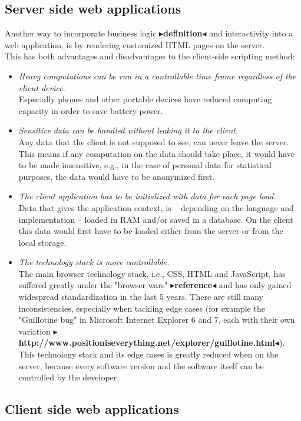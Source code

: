 \documentclass[twoside,11pt,openright]{report}
\newcommand{\todo}[1]{{\color[rgb]{.5,0,0}\textbf{$\blacktriangleright$#1$\blacktriangleleft$}}}
\begin{document}
\subsection{Server side web applications}
Another way to incorporate business logic \todo{definition} and
interactivity into a web application, is by rendering customized HTML pages
on the server.\\
This has both advantages and disadvantages to the client-side scripting method:
\begin{itemize}
	\item \emph{Heavy computations can be run in a controllable time frame
	regardless of the client device.}\\
		Especially phones and other portable devices have reduced computing
		capacity in order to save battery power.
	\item \emph{Sensitive data can be handled without leaking it to the
	client.}\\
		Any data that the client is not supposed to see, can never leave the
		server. This means if any computation on the data should take place,
		it would have to be made insensitive, e.g., in the case of personal data
		for statistical purposes, the data would have to be anonymized first.
	\item \emph{The client application has to be initialized with data for each
	page load.}\\
		Data that gives the application context, is -- depending on the language
		and implementation -- loaded in RAM and/or saved in a database. On the
		client this data would first have to be loaded either from the server or
		from the local storage.
	\item \emph{The technology stack is more controllable.}\\
		The main browser technology stack, i.e., CSS, HTML and JavaScript,
		has suffered greatly under the "browser wars" \todo{reference}
		and has only gained widespread standardization in the last 5 years.
		There are still many inconsistencies, especially when tackling edge cases
		(for example the "Guillotine bug" in Microsoft Internet Explorer 6 and 7,
		each with their own variation
		\todo{http://www.positioniseverything.net/explorer/guillotine.html}).
		This technology stack and its edge cases is greatly reduced when
		on the server, because every software version and the software itself can
		be controlled by the developer.
\end{itemize}

\subsection{Client side web applications}
\end{document}
